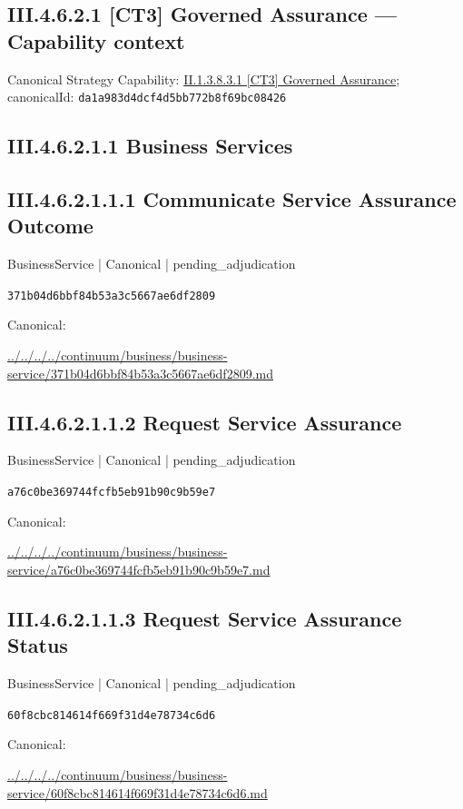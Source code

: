 \documentclass[10pt,a4paper]{article}
\begin{document}
\subsection*{III.4.6.2.1 [CT3] Governed Assurance — Capability context}
Canonical Strategy Capability: \hyperref[element-da1a983d4dcf4d5bb772b8f69bc08426]{II.1.3.8.3.1 [CT3] Governed Assurance}; canonicalId: \texttt{da1a983d4dcf4d5bb772b8f69bc08426}\par
\subsection*{III.4.6.2.1.1 Business Services}
\subsection*{III.4.6.2.1.1.1 Communicate Service Assurance Outcome}
\label{element-371b04d6bbf84b53a3c5667ae6df2809}
{\small BusinessService | Canonical | pending\_adjudication}\par
\texttt{371b04d6bbf84b53a3c5667ae6df2809}\par
Canonical: \par
{\footnotesize\url{../../../../continuum/business/business-service/371b04d6bbf84b53a3c5667ae6df2809.md}}\par
\subsection*{III.4.6.2.1.1.2 Request Service Assurance}
\label{element-a76c0be369744fcfb5eb91b90c9b59e7}
{\small BusinessService | Canonical | pending\_adjudication}\par
\texttt{a76c0be369744fcfb5eb91b90c9b59e7}\par
Canonical: \par
{\footnotesize\url{../../../../continuum/business/business-service/a76c0be369744fcfb5eb91b90c9b59e7.md}}\par
\subsection*{III.4.6.2.1.1.3 Request Service Assurance Status}
\label{element-60f8cbc814614f669f31d4e78734c6d6}
{\small BusinessService | Canonical | pending\_adjudication}\par
\texttt{60f8cbc814614f669f31d4e78734c6d6}\par
Canonical: \par
{\footnotesize\url{../../../../continuum/business/business-service/60f8cbc814614f669f31d4e78734c6d6.md}}\par
\end{document}
